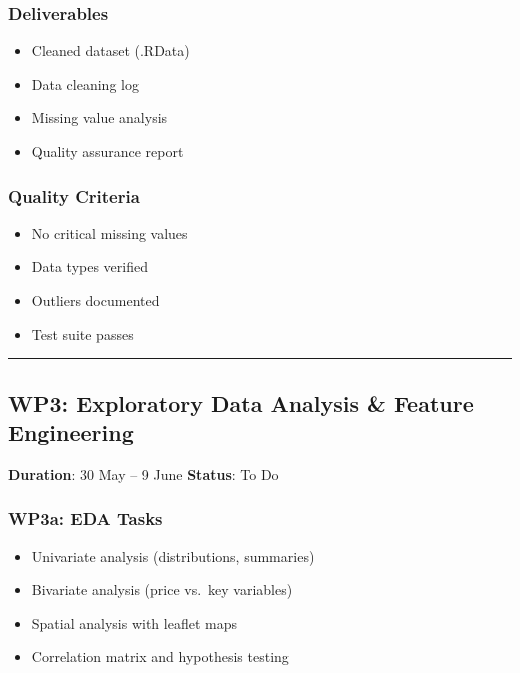 \documentclass[
  english,
  letterpaper,
  DIV=11,
  numbers=noendperiod]{scrreprt}
\providecommand{\tightlist}{%
  \setlength{\itemsep}{0pt}\setlength{\parskip}{0pt}}
\begin{document}
\subsubsection{Deliverables}\label{deliverables-2}

\begin{itemize}
\tightlist
\item
  Cleaned dataset (.RData)
\item
  Data cleaning log
\item
  Missing value analysis
\item
  Quality assurance report
\end{itemize}

\subsubsection{Quality Criteria}\label{quality-criteria-1}

\begin{itemize}
\tightlist
\item[$\square$]
  No critical missing values
\item[$\square$]
  Data types verified
\item[$\square$]
  Outliers documented
\item[$\square$]
  Test suite passes
\end{itemize}

\begin{center}\rule{0.5\linewidth}{0.5pt}\end{center}

\subsection{WP3: Exploratory Data Analysis \& Feature
Engineering}\label{wp3-exploratory-data-analysis-feature-engineering}

\textbf{Duration}: 30 May -- 9 June \textbar{} \textbf{Status}: To Do

\subsubsection{WP3a: EDA Tasks}\label{wp3a-eda-tasks}

\begin{itemize}
\tightlist
\item
  Univariate analysis (distributions, summaries)
\item
  Bivariate analysis (price vs.~key variables)
\item
  Spatial analysis with leaflet maps
\item
  Correlation matrix and hypothesis testing
\end{itemize}
\end{document}
